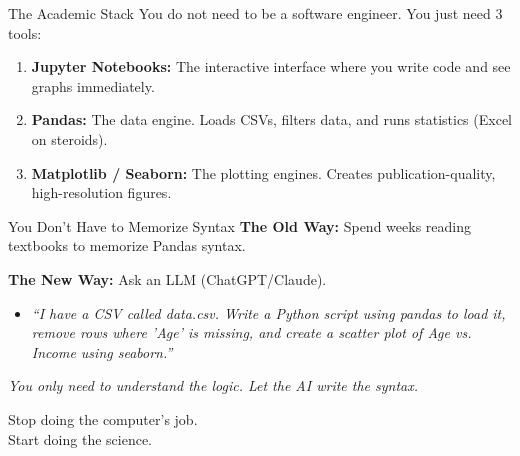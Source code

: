 \documentclass[aspectratio=169]{beamer}
\begin{document}
\begin{frame}{The Academic Stack}
  You do not need to be a software engineer. You just need 3 tools:
  \vspace{0.3cm}
  \begin{enumerate}
    \item \textbf{Jupyter Notebooks:} The interactive interface where you write code and see graphs immediately.
    \item \textbf{Pandas:} The data engine. Loads CSVs, filters data, and runs statistics (Excel on steroids).
    \item \textbf{Matplotlib / Seaborn:} The plotting engines. Creates publication-quality, high-resolution figures.
  \end{enumerate}
\end{frame}

\begin{frame}{You Don't Have to Memorize Syntax}
  \textbf{The Old Way:} Spend weeks reading textbooks to memorize Pandas syntax.
  
  \vspace{0.5cm}
  \textbf{The New Way:} Ask an LLM (ChatGPT/Claude).
  \begin{itemize}
    \item \textit{``I have a CSV called data.csv. Write a Python script using pandas to load it, remove rows where 'Age' is missing, and create a scatter plot of Age vs. Income using seaborn.''}
  \end{itemize}
  \vspace{0.5cm}
  \textit{You only need to understand the logic. Let the AI write the syntax.}
\end{frame}

\begin{frame}[standout]
  Stop doing the computer's job.\\
  Start doing the science.
\end{frame}
\end{document}
